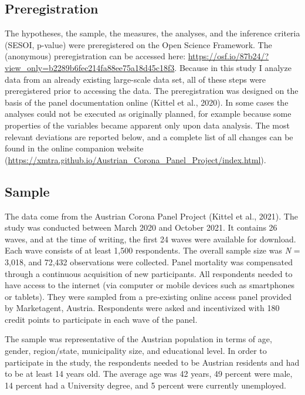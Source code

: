 \documentclass[
  english,
  man,mask,floatsintext]{apa6}
\begin{document}
\hypertarget{preregistration}{%
\subsection{Preregistration}\label{preregistration}}

The hypotheses, the sample, the measures, the analyses, and the inference criteria (SESOI, p-value) were preregistered on the Open Science Framework.
The (anonymous) preregistration can be accessed here: \url{https://osf.io/87b24/?view_only=b2289b6fec214fa88ee75a18d45c18f3}.
Because in this study I analyze data from an already existing large-scale data set, all of these steps were preregistered prior to accessing the data.
The preregistration was designed on the basis of the panel documentation online (Kittel et al., 2020).
In some cases the analyses could not be executed as originally planned, for example because some properties of the variables became apparent only upon data analysis.
The most relevant deviations are reported below, and a complete list of all changes can be found in the online companion website (\url{https://xmtra.github.io/Austrian_Corona_Panel_Project/index.html}).

\hypertarget{sample}{%
\subsection{Sample}\label{sample}}

The data come from the Austrian Corona Panel Project (Kittel et al., 2021).
The study was conducted between March 2020 and October 2021.
It contains 26 waves, and at the time of writing, the first 24 waves were available for download.
Each wave consists of at least 1,500 respondents.
The overall sample size was \emph{N} = 3,018, and 72,432 observations were collected.
Panel mortality was compensated through a continuous acquisition of new participants.
All respondents needed to have access to the internet (via computer or mobile devices such as smartphones or tablets).
They were sampled from a pre-existing online access panel provided by Marketagent, Austria.
Respondents were asked and incentivized with 180 credit points to participate in each wave of the panel.

The sample was representative of the Austrian population in terms of age, gender, region/state, municipality size, and educational level. In order to participate in the study, the respondents needed to be Austrian residents and had to be at least 14 years old.
The average age was 42 years, 49 percent were male, 14 percent had a University degree, and 5 percent were currently unemployed.
\end{document}
